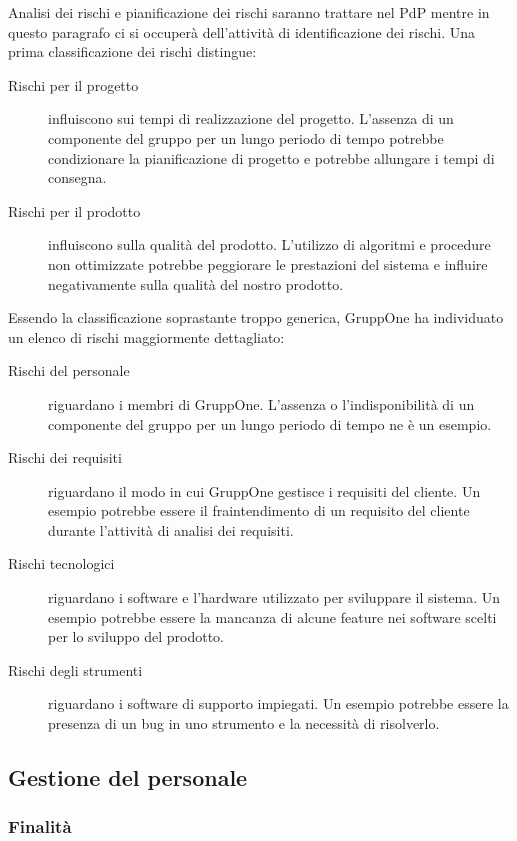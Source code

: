 \documentclass[../norme-di-progetto.tex]{subfiles}
\begin{document}
Analisi dei rischi e pianificazione dei rischi saranno trattare nel PdP mentre in questo paragrafo ci si occuperà dell'attività di identificazione dei rischi.
Una prima classificazione dei rischi distingue:

\begin{description}
  \item [Rischi per il progetto] influiscono sui tempi di realizzazione del progetto. L'assenza di un componente del gruppo per un lungo periodo di tempo potrebbe condizionare la pianificazione di progetto e potrebbe allungare i tempi di consegna.
  \item [Rischi per il prodotto] influiscono sulla qualità del prodotto. L'utilizzo di algoritmi e procedure non ottimizzate potrebbe peggiorare le prestazioni del sistema e influire negativamente sulla qualità del nostro prodotto.
\end{description}
Essendo la classificazione soprastante troppo generica, GruppOne ha individuato un elenco di rischi maggiormente dettagliato:
\begin{description}
  \item [Rischi del personale] riguardano i membri di GruppOne. L'assenza o l'indisponibilità di un componente del gruppo per un lungo periodo di tempo ne è un esempio.
  \item [Rischi dei requisiti] riguardano il modo in cui GruppOne gestisce i requisiti del cliente. Un esempio potrebbe essere il fraintendimento di un requisito del cliente durante l'attività di analisi dei requisiti.
  \item [Rischi tecnologici] riguardano i software e l'hardware utilizzato per sviluppare il sistema. Un esempio potrebbe essere la mancanza di alcune feature nei software scelti per lo sviluppo del prodotto.
  \item [Rischi degli strumenti] riguardano i software di supporto impiegati. Un esempio potrebbe essere la presenza di un bug in uno strumento e la necessità di risolverlo.
\end{description}

\subsection{Gestione del personale}%
\label{sub:gestione_del_personale}

\subsubsection{Finalità}%
\label{subs:Gestione_del_personale/finalita}
\end{document}
